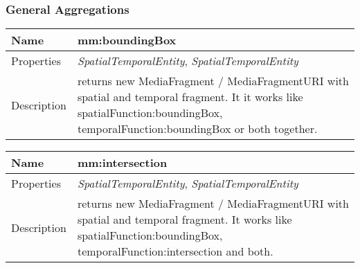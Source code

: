\subsubsection*{General Aggregations}
\begin{tabular}{|p{3cm}|p{10cm}|}
\hline Name & mm:boundingBox\\
\hline Properties & \textit{SpatialTemporalEntity}, \textit{SpatialTemporalEntity} \\
\hline Description & returns new MediaFragment / MediaFragmentURI with spatial and temporal fragment. It it works like spatialFunction:boundingBox, temporalFunction:boundingBox or both together.\\
\hline
\end{tabular}
\vspace{0.3cm}
\newline
\begin{tabular}{|p{3cm}|p{10cm}|}
\hline Name & mm:intersection\\
\hline Properties & \textit{SpatialTemporalEntity}, \textit{SpatialTemporalEntity} \\
\hline Description & returns new MediaFragment / MediaFragmentURI with spatial and temporal fragment. It works like spatialFunction:boundingBox, temporalFunction:intersection and both.\\
\hline
\end{tabular}
\vspace{0.3cm}
\newline
